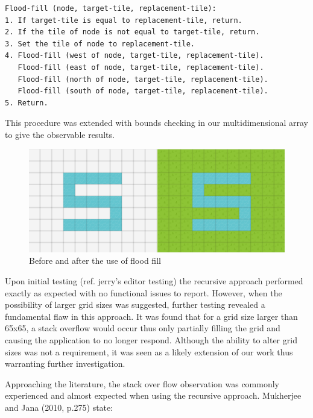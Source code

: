 \begin{minipage}{0.9\textwidth}
	\begin{lstlisting}[caption={4-way stack based recursive flood fill}, label={lst:stackFloodFill}]
Flood-fill (node, target-tile, replacement-tile):
1. If target-tile is equal to replacement-tile, return.
2. If the tile of node is not equal to target-tile, return.
3. Set the tile of node to replacement-tile.
4. Flood-fill (west of node, target-tile, replacement-tile).
   Flood-fill (east of node, target-tile, replacement-tile).
   Flood-fill (north of node, target-tile, replacement-tile).
   Flood-fill (south of node, target-tile, replacement-tile).
5. Return.
	\end{lstlisting}
\end{minipage}

This procedure was extended with bounds checking in our multidimensional array to give the observable results.

\begin{figure}[h]
	\begin{center}
		\includegraphics[scale=0.8]{img/floodFill.png}
		\caption[Flood Fill]{Before and after the use of flood fill}
		\label{fig:animthread}
	\end{center}
\end{figure}

Upon initial testing (ref. jerry's editor testing) the recursive approach performed exactly as expected with no functional issues  to report.  However, when the possibility of larger grid sizes was suggested, further testing revealed a fundamental flaw in this approach.  It was found that for a grid size larger than 65x65, a stack overflow would occur thus only partially filling the grid and causing the application to no longer respond.  Although the ability to alter grid sizes was not a requirement, it was seen as a likely extension of our work thus warranting further investigation.  

Approaching the literature, the stack over flow observation was commonly experienced and almost expected when using the recursive approach.  Mukherjee and Jana (2010, p.275) state:

